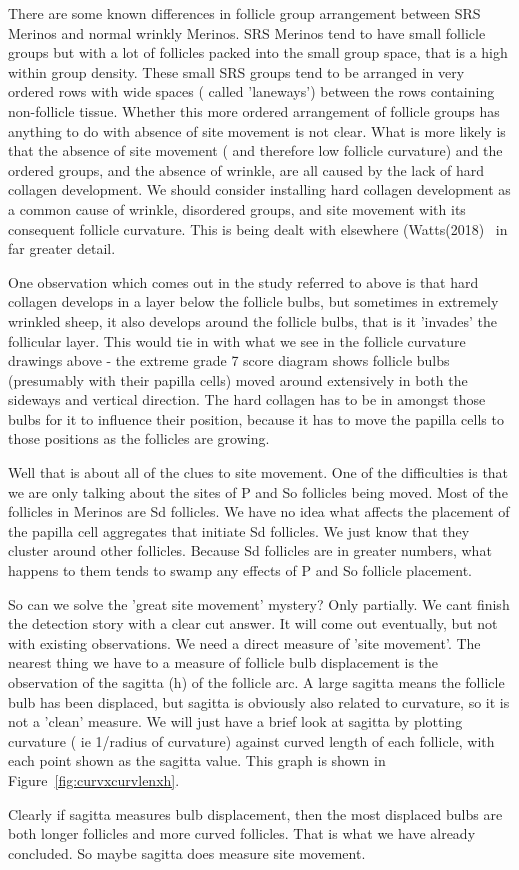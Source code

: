 \documentclass[titlepage]{article}  %
\begin{document}
There are some known differences in follicle group arrangement between SRS Merinos and normal wrinkly Merinos.  SRS Merinos tend to have small follicle groups but with a lot of follicles packed into the small group space, that is a high within group density. These small SRS groups tend to be arranged in very ordered rows with wide spaces ( called 'laneways') between the rows containing non-follicle tissue. Whether this more ordered arrangement of follicle groups has  anything to do with absence of site movement is not clear.  What is more likely is that the absence of site movement ( and therefore low follicle curvature) and the ordered groups, and the absence of wrinkle, are all caused by the lack of hard collagen development.  We should consider installing  hard collagen development as a common cause of wrinkle, disordered groups, and site movement with its consequent follicle curvature. This is being dealt with elsewhere (Watts(2018)~\cite{watt:18} in far greater detail.

One observation which comes out in the study referred to above is that hard collagen develops in a layer below the follicle bulbs, but sometimes in extremely wrinkled sheep, it also develops around the follicle bulbs, that is it 'invades' the follicular layer. This would tie in with what we see in the follicle curvature drawings above - the extreme grade 7 score diagram shows follicle bulbs (presumably with their papilla cells) moved around extensively in both the sideways and vertical direction. The hard collagen has to be in amongst those bulbs for it to influence their position, because it has to move the papilla cells to those positions as the follicles are growing.

Well that is about all of the clues to site movement. One of the difficulties is that we are only talking about the sites of P and So follicles being moved. Most of the follicles in Merinos are Sd follicles. We have no idea what affects the placement of the papilla cell aggregates that initiate Sd follicles. We just know that they cluster around other follicles. Because Sd follicles are in greater numbers, what happens to them tends to swamp any effects of P and So follicle placement. 

So can we solve the 'great site movement' mystery? Only partially. We cant finish the detection story with a clear cut answer. It will come out eventually, but not with existing observations. We need a direct measure of 'site movement'. The nearest thing we have to a measure of follicle bulb displacement is the observation of the sagitta (h) of the follicle arc. A large sagitta means the follicle bulb has been displaced, but sagitta is obviously also related to curvature, so it is not a 'clean' measure.  We will just have a brief look at sagitta by plotting curvature ( ie 1/radius of curvature) against curved length of each follicle, with each point shown as the sagitta value. This graph is shown in Figure~\ref{fig:curvxcurvlenxh}.

 Clearly if sagitta measures bulb displacement, then the most displaced bulbs are both longer follicles and more curved follicles. That is what we have already concluded. So maybe sagitta does measure site movement. 
\end{document}
